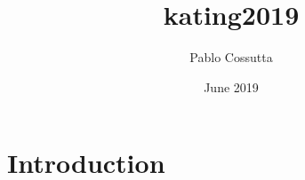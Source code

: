 \documentclass{article}
\title{kating2019}
\author{Pablo Cossutta}
\date{June 2019}
\begin{document}
\maketitle

\section{Introduction}
\end{document}
